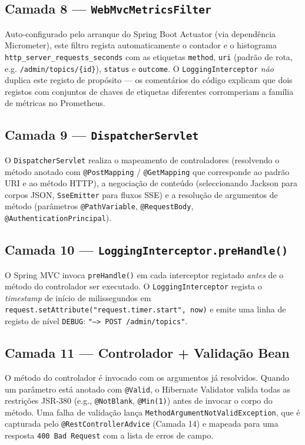 \subsection*{Camada 8 — \texttt{WebMvcMetricsFilter}}

Auto-configurado pelo arranque do Spring Boot Actuator (via dependência
Micrometer), este filtro regista automaticamente o contador e o histograma
\texttt{http\_server\_requests\_seconds} com as etiquetas \texttt{method},
\texttt{uri} (padrão de rota, e.g. \texttt{/admin/topics/\{id\}}),
\texttt{status} e \texttt{outcome}.
O \texttt{LoggingInterceptor} \emph{não} duplica este registo de propósito —
os comentários do código explicam que dois registos com conjuntos de
chaves de etiquetas diferentes corromperiam a família de métricas no
Prometheus.

\subsection*{Camada 9 — \texttt{DispatcherServlet}}

O \texttt{DispatcherServlet} realiza o mapeamento de controladores
(resolvendo o método anotado com \texttt{@PostMapping} / \texttt{@GetMapping}
que corresponde ao padrão URI e ao método HTTP), a negociação de conteúdo
(seleccionando Jackson para corpos JSON, \texttt{SseEmitter} para fluxos
SSE) e a resolução de argumentos de método (parâmetros \texttt{@PathVariable},
\texttt{@RequestBody}, \texttt{@AuthenticationPrincipal}).

\subsection*{Camada 10 — \texttt{LoggingInterceptor.preHandle()}}

O Spring MVC invoca \texttt{preHandle()} em cada interceptor registado
\emph{antes} de o método do controlador ser executado.
O \texttt{LoggingInterceptor} regista o \textit{timestamp} de início de
milissegundos em \texttt{request.setAttribute("request.timer.start", now)}
e emite uma linha de registo de nível \texttt{DEBUG}:
\texttt{"--> POST /admin/topics"}.

\subsection*{Camada 11 — Controlador + Validação Bean}

O método do controlador é invocado com os argumentos já resolvidos.
Quando um parâmetro está anotado com \texttt{@Valid}, o Hibernate Validator
valida todas as restrições JSR-380 (e.g., \texttt{@NotBlank},
\texttt{@Min(1)}) antes de invocar o corpo do método.
Uma falha de validação lança \texttt{MethodArgumentNotValidException}, que
é capturada pelo \texttt{@RestControllerAdvice} (Camada 14) e mapeada para
uma resposta \texttt{400 Bad Request} com a lista de erros de campo.

